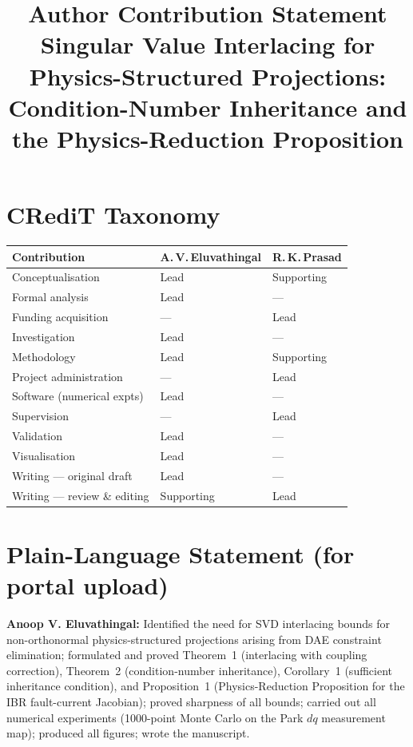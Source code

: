 \documentclass[11pt,a4paper]{article}
\title{\textbf{Author Contribution Statement}\\[4pt]
       \large Singular Value Interlacing for Physics-Structured Projections:
       Condition-Number Inheritance and the Physics-Reduction Proposition}
\author{}
\date{}
\begin{document}
\maketitle\thispagestyle{empty}

\section*{CRediT Taxonomy}

\noindent
\begin{tabular}{@{}p{5.8cm} p{3.0cm} p{3.0cm}@{}}
\toprule
\textbf{Contribution} & \textbf{A.\,V.\,Eluvathingal} & \textbf{R.\,K.\,Prasad} \\
\midrule
Conceptualisation          & Lead   & Supporting \\
Formal analysis            & Lead   & ---        \\
Funding acquisition        & ---    & Lead       \\
Investigation              & Lead   & ---        \\
Methodology                & Lead   & Supporting \\
Project administration     & ---    & Lead       \\
Software (numerical expts) & Lead   & ---        \\
Supervision                & ---    & Lead       \\
Validation                 & Lead   & ---        \\
Visualisation              & Lead   & ---        \\
Writing --- original draft & Lead   & ---        \\
Writing --- review \& editing & Supporting & Lead \\
\bottomrule
\end{tabular}

\bigskip

\section*{Plain-Language Statement (for portal upload)}

\textbf{Anoop V. Eluvathingal:} Identified the need for SVD interlacing
bounds for non-orthonormal physics-structured projections arising from
DAE constraint elimination; formulated and proved Theorem~1 (interlacing
with coupling correction), Theorem~2 (condition-number inheritance),
Corollary~1 (sufficient inheritance condition), and Proposition~1
(Physics-Reduction Proposition for the IBR fault-current Jacobian);
proved sharpness of all bounds; carried out all numerical experiments
(1000-point Monte Carlo on the Park $dq$ measurement map); produced
all figures; wrote the manuscript.
\end{document}
